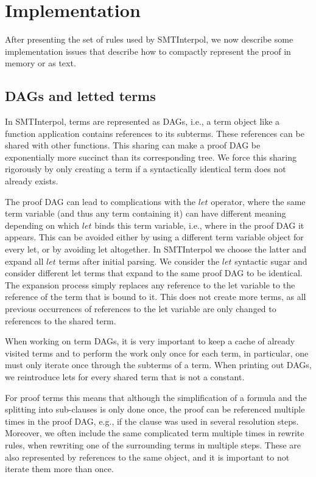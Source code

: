 \documentclass[a4paper]{article}
\newcommand\si{SMTInterpol\xspace}
\begin{document}
\section{Implementation}
After presenting the set of rules used by \si, we now describe some
implementation issues that describe how to compactly represent the
proof in memory or as text.

\subsection{DAGs and letted terms}
In \si, terms are represented as DAGs, i.e., a term object like a
function application contains references to its subterms.  These
references can be shared with other functions.  This sharing can make
a proof DAG be exponentially more succinct than its corresponding
tree.  We force this sharing rigorously by only creating a term if a
syntactically identical term does not already exists.

The proof DAG can lead to complications with the $let$ operator, where
the same term variable (and thus any term containing it) can have
different meaning depending on which $let$ binds this term variable,
i.e., where in the proof DAG it appears.  This can be avoided either
by using a different term variable object for every let, or by
avoiding let altogether.  In \si we choose the latter and expand all
$let$ terms after initial parsing.  We consider the $let$ syntactic
sugar and consider different let terms that expand to the same proof
DAG to be identical.  The expansion process simply replaces any
reference to the let variable to the reference of the term that is
bound to it.  This does not create more terms, as all previous
occurrences of references to the let variable are only changed to
references to the shared term.

When working on term DAGs, it is very important to keep a cache of
already visited terms and to perform the work only once for each term,
in particular, one must only iterate once through the subterms of a
term.  When printing out DAGs, we reintroduce lets for every shared
term that is not a constant.

For proof terms this means that although the simplification of a
formula and the splitting into sub-clauses is only done once, the
proof can be referenced multiple times in the proof DAG, e.g., if the
clause was used in several resolution steps.  Moreover, we often
include the same complicated term multiple times in rewrite rules,
when rewriting one of the surrounding terms in multiple steps.  These
are also represented by references to the same object, and it is
important to not iterate them more than once.
\end{document}

